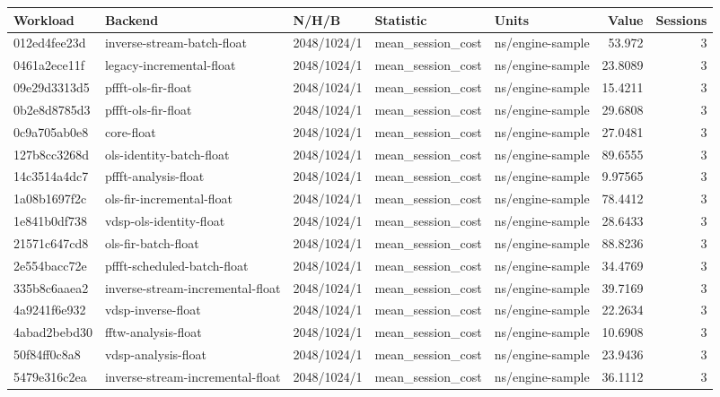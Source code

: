 \begingroup\scriptsize
\begin{longtable}{lllllrr}
Workload & Backend & N/H/B & Statistic & Units & Value & Sessions \\
\hline
012ed4fee23d & inverse-stream-batch-float & 2048/1024/1 & mean\_session\_cost & ns/engine-sample & 53.972 & 3 \\
0461a2ece11f & legacy-incremental-float & 2048/1024/1 & mean\_session\_cost & ns/engine-sample & 23.8089 & 3 \\
09e29d3313d5 & pffft-ols-fir-float & 2048/1024/1 & mean\_session\_cost & ns/engine-sample & 15.4211 & 3 \\
0b2e8d8785d3 & pffft-ols-fir-float & 2048/1024/1 & mean\_session\_cost & ns/engine-sample & 29.6808 & 3 \\
0c9a705ab0e8 & core-float & 2048/1024/1 & mean\_session\_cost & ns/engine-sample & 27.0481 & 3 \\
127b8cc3268d & ols-identity-batch-float & 2048/1024/1 & mean\_session\_cost & ns/engine-sample & 89.6555 & 3 \\
14c3514a4dc7 & pffft-analysis-float & 2048/1024/1 & mean\_session\_cost & ns/engine-sample & 9.97565 & 3 \\
1a08b1697f2c & ols-fir-incremental-float & 2048/1024/1 & mean\_session\_cost & ns/engine-sample & 78.4412 & 3 \\
1e841b0df738 & vdsp-ols-identity-float & 2048/1024/1 & mean\_session\_cost & ns/engine-sample & 28.6433 & 3 \\
21571c647cd8 & ols-fir-batch-float & 2048/1024/1 & mean\_session\_cost & ns/engine-sample & 88.8236 & 3 \\
2e554bacc72e & pffft-scheduled-batch-float & 2048/1024/1 & mean\_session\_cost & ns/engine-sample & 34.4769 & 3 \\
335b8c6aaea2 & inverse-stream-incremental-float & 2048/1024/1 & mean\_session\_cost & ns/engine-sample & 39.7169 & 3 \\
4a9241f6e932 & vdsp-inverse-float & 2048/1024/1 & mean\_session\_cost & ns/engine-sample & 22.2634 & 3 \\
4abad2bebd30 & fftw-analysis-float & 2048/1024/1 & mean\_session\_cost & ns/engine-sample & 10.6908 & 3 \\
50f84ff0c8a8 & vdsp-analysis-float & 2048/1024/1 & mean\_session\_cost & ns/engine-sample & 23.9436 & 3 \\
5479e316c2ea & inverse-stream-incremental-float & 2048/1024/1 & mean\_session\_cost & ns/engine-sample & 36.1112 & 3 \\

\end{longtable}

